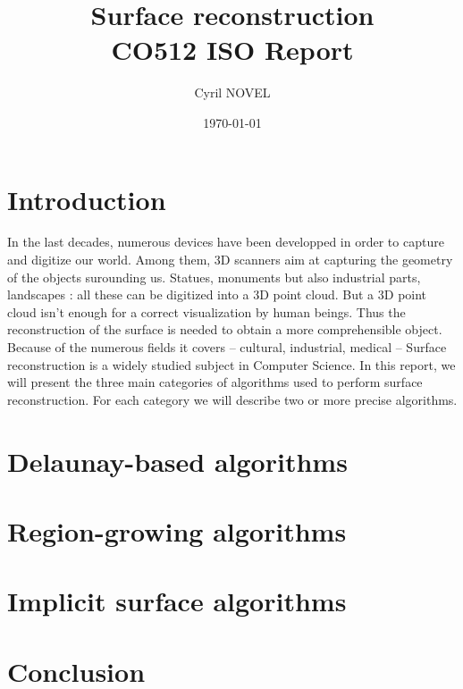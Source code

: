 \documentclass[a4paper]{article}
\title{Surface reconstruction\\
\large{CO512 ISO Report}}
\author{Cyril NOVEL}
\date{\today}
\begin{document}
\maketitle
\newpage

\section{Introduction}
In the last decades, numerous devices have been developped in order to capture and digitize our world. Among them, 3D scanners aim at capturing the geometry of the objects surounding us. Statues, monuments but also industrial parts, landscapes : all these can be digitized into a 3D point cloud. But a 3D point cloud isn't enough for a correct visualization by human beings. Thus the reconstruction of the surface is needed to obtain a more comprehensible object.
Because of the numerous fields it covers -- cultural, industrial, medical -- Surface reconstruction is a widely studied subject in Computer Science. In this report, we will present the three main categories of algorithms used to perform surface reconstruction. For each category we will describe two or more precise algorithms.

\section{Delaunay-based algorithms}

\section{Region-growing algorithms}

\section{Implicit surface algorithms}


\section{Conclusion}
\end{document}
